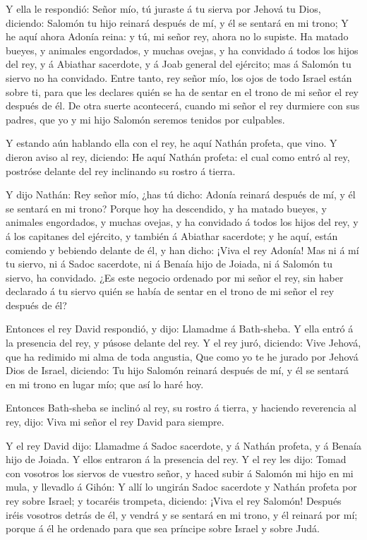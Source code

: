  Y ella le respondió: Señor mío, tú juraste á tu sierva por
Jehová tu Dios, diciendo: Salomón tu hijo reinará después de mí, y él se
sentará en mi trono;  Y he aquí ahora Adonía reina: y tú,
mi señor rey, ahora no lo supiste.  Ha matado bueyes, y
animales engordados, y muchas ovejas, y ha convidado á todos los hijos
del rey, y á Abiathar sacerdote, y á Joab general del ejército; mas á
Salomón tu siervo no ha convidado.  Entre tanto, rey señor
mío, los ojos de todo Israel están sobre ti, para que les declares quién
se ha de sentar en el trono de mi señor el rey después de él.
 De otra suerte acontecerá, cuando mi señor el rey durmiere
con sus padres, que yo y mi hijo Salomón seremos tenidos por culpables.

 Y estando aún hablando ella con el rey, he aquí Nathán
profeta, que vino.  Y dieron aviso al rey, diciendo: He
aquí Nathán profeta: el cual como entró al rey, postróse delante del rey
inclinando su rostro á tierra.

 Y dijo Nathán: Rey señor mío, ¿has tú dicho: Adonía
reinará después de mí, y él se sentará en mi trono?  Porque
hoy ha descendido, y ha matado bueyes, y animales engordados, y muchas
ovejas, y ha convidado á todos los hijos del rey, y á los capitanes del
ejército, y también á Abiathar sacerdote; y he aquí, están comiendo y
bebiendo delante de él, y han dicho: ¡Viva el rey Adonía! 
Mas ni á mí tu siervo, ni á Sadoc sacerdote, ni á Benaía hijo de Joiada,
ni á Salomón tu siervo, ha convidado.  ¿Es este negocio
ordenado por mi señor el rey, sin haber declarado á tu siervo quién se
había de sentar en el trono de mi señor el rey después de él?

 Entonces el rey David respondió, y dijo: Llamadme á
Bath-sheba. Y ella entró á la presencia del rey, y púsose delante del
rey.  Y el rey juró, diciendo: Vive Jehová, que ha redimido
mi alma de toda angustia,  Que como yo te he jurado por
Jehová Dios de Israel, diciendo: Tu hijo Salomón reinará después de mí,
y él se sentará en mi trono en lugar mío; que así lo haré hoy.

 Entonces Bath-sheba se inclinó al rey, su rostro á tierra,
y haciendo reverencia al rey, dijo: Viva mi señor el rey David para
siempre.

 Y el rey David dijo: Llamadme á Sadoc sacerdote, y á
Nathán profeta, y á Benaía hijo de Joiada. Y ellos entraron á la
presencia del rey.  Y el rey les dijo: Tomad con vosotros
los siervos de vuestro señor, y haced subir á Salomón mi hijo en mi
mula, y llevadlo á Gihón:  Y allí lo ungirán Sadoc
sacerdote y Nathán profeta por rey sobre Israel; y tocaréis trompeta,
diciendo: ¡Viva el rey Salomón!  Después iréis vosotros
detrás de él, y vendrá y se sentará en mi trono, y él reinará por mí;
porque á él he ordenado para que sea príncipe sobre Israel y sobre Judá.

